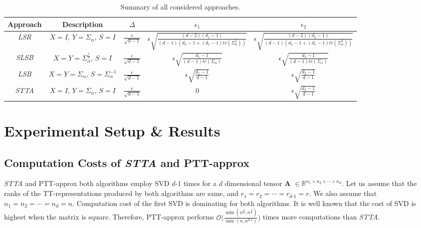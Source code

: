 \documentclass[sigconf]{acmart}
\makeatletter
\newcommand{\tensor}[1]{{\cal\textbf{#1}\xspace}}
\newcommand{\hfirst}{{\it LSR}\xspace}
\newcommand{\hsecond}{{\it SLSB}\xspace}
\newcommand{\hthird}{{\it LSB}\xspace}
\newcommand{\otta}{{\it STTA}\xspace}
\DeclareRobustCommand*\cal{\@fontswitch\relax\mathcal}
\makeatother
\begin{document}
\begin{table*}[htb]
	{\begin{tabular}{|c|c|c|c|c|}
			\hline
			Approach & Description & $\Delta$ & $\epsilon_1$ & $\epsilon_2$\\ \hline
			\hfirst & $X = I$, $Y = \Sigma_\alpha$, $S = I$ & $\frac{\epsilon}{\sqrt{d-1}}$ & $\epsilon \sqrt{\frac{(d-2)(d_1-1)}{(d-1) (d_2 -1 + (d_1-1) tr(\Sigma_\alpha^2))}}$ & $\epsilon \sqrt{\frac{(d-2)(d_2-1)}{(d-1) (d_2 -1 + (d_1-1) tr(\Sigma_\alpha^2))}}$\\ \hline
			\hsecond & $X=Y=\Sigma_\alpha^{\frac{1}{2}}$, $S=I$ & $\frac{\epsilon}{\sqrt{d-1}}$ &
			$\epsilon\sqrt{\frac{d_1-1}{(d-1)tr(\Sigma_\alpha)}}$ & $\epsilon\sqrt{\frac{d_2-1}{(d-1)tr(\Sigma_\alpha)}}$\\ \hline
			\hthird & $X=Y=\Sigma_\alpha$, $S=\Sigma_\alpha^{-1}$ & $\frac{\epsilon}{\sqrt{d-1}}$ &
			$\epsilon\sqrt{\frac{d_1-1}{d-1}}$ & $\epsilon\sqrt{\frac{d_2-1}{d-1}}$\\ \hline 
			\otta & $X=I$, $Y=\Sigma_\alpha$, $S=I$ & $\frac{\epsilon}{\sqrt{d-1}}$ &
			$0$ & $\epsilon\sqrt{\frac{d_2-1}{d-1}}$\\ \hline
	\end{tabular}}
	\caption{Summary of all considered approaches\label{tab:summary}.}
\end{table*}



\section{Experimental Setup \& Results}
\label{sec:expResults}
\subsection{Computation Costs of \otta and PTT-approx}
\label{sec:exp:computationCost}
\otta and PTT-approx both algorithms employ SVD $d$-$1$ times for a $d$ dimensional tensor \tensor{A} $\in \mathbb{R}^{n_1 \times n_2 \times \cdots \times n_d}$. Let us assume that the ranks of the TT-representations produced by both algorithms are same, and $r_1=r_2=\cdots=r_{d\text{-}1}=r$. We also assume that $n_1=n_2=\cdots=n_d=n$. Computation cost of the first SVD is dominating for both algorithms. It is well known that the cost of SVD is highest when the matrix is square. Therefore, PTT-approx performs $\mathcal{O}\big(\frac{\min(n^{\frac{d}{2}}, n^{\frac{d}{2}}) }{\min(n,n^{d\text{-}1})} \big)$ times more computations than \otta.       
\end{document}
